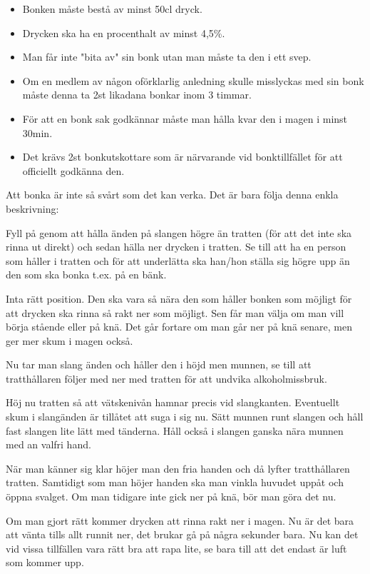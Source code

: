 \begin{itemize}
    \item Bonken måste bestå av minst 50cl dryck.
    \item Drycken ska ha en procenthalt av minst 4,5\%.
    \item Man får inte "bita av" sin bonk utan man måste ta den i ett svep.
    \item Om en medlem av någon oförklarlig anledning skulle misslyckas med sin bonk måste denna ta 2st likadana bonkar inom 3 timmar.
    \item För att en bonk sak godkännar måste man hålla kvar den i magen i minst 30min.
    \item Det krävs 2st bonkutskottare som är närvarande vid bonktillfället för att officiellt godkänna den.
\end{itemize}\newpage


Att bonka är inte så svårt som det kan verka. Det är bara följa denna enkla beskrivning:

Fyll på genom att hålla änden på slangen högre än tratten (för att det inte ska rinna ut direkt) och sedan hälla ner drycken i tratten. Se till att ha en person som håller i tratten och för att underlätta ska han/hon ställa sig högre upp än den som ska bonka t.ex. på en bänk.

Inta rätt position. Den ska vara så nära den som håller bonken som möjligt för att drycken ska rinna så rakt ner som möjligt. Sen får man välja om man vill börja stående eller på knä. Det går fortare om man går ner på knä senare, men ger mer skum i magen också.

Nu tar man slang änden och håller den i höjd men munnen, se till att tratthållaren följer med ner med tratten för att undvika alkoholmissbruk.

Höj nu tratten så att vätskenivån hamnar precis vid slangkanten. Eventuellt skum i slangänden är tillåtet att suga i sig nu. Sätt munnen runt slangen och håll fast slangen lite lätt med tänderna. Håll också i slangen ganska nära munnen med an valfri hand.

När man känner sig klar höjer man den fria handen och då lyfter tratthållaren tratten. Samtidigt som man höjer handen ska man vinkla huvudet uppåt och öppna svalget. Om man tidigare inte gick ner på knä, bör man göra det nu.

Om man gjort rätt kommer drycken att rinna rakt ner i magen. Nu är det bara att vänta tills allt runnit ner, det brukar gå på några sekunder bara. Nu kan det vid vissa tillfällen vara rätt bra att rapa lite, se bara till att det endast är luft som kommer upp.

